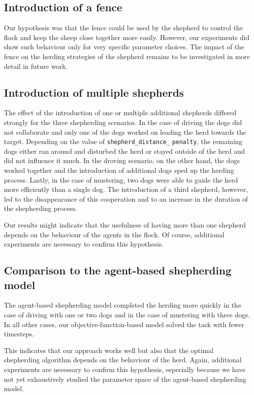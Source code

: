 \subsection{Introduction of a fence}
Our hypothesis was that the fence could be used by the shepherd to control the flock and keep the sheep close together more easily. However, our experiments did show such behaviour only for very specific parameter choices. The impact of the fence on the herding strategies of the shepherd remains to be investigated in more detail in future work.

\subsection{Introduction of multiple shepherds}
The effect of the introduction of one or multiple additional shepherds differed strongly for the three shepherding scenarios. In the case of driving the dogs did not collaborate and only one of the dogs worked on leading the herd towards the target. Depending on the value of \texttt{shepherd\_distance\_} \texttt{penalty}, the remaining dogs either ran around and disturbed the herd or stayed outside of the herd and did not influence it much. In the droving scenario, on the other hand, the dogs worked together and the introduction of additional dogs sped up the herding process. Lastly, in the case of mustering, two dogs were able to guide the herd more efficiently than a single dog. The introduction of a third shepherd, however, led to the disappearance of this cooperation and to an increase in the duration of the shepherding process.

Our results might indicate that the usefulness of having more than one shepherd depends on the behaviour of the agents in the flock. Of course, additional experiments are necessary to confirm this hypothesis.

\subsection{Comparison to the agent-based shepherding model}
The agent-based shepherding model completed the herding more quickly in the case of driving with one or two dogs and in the case of mustering with three dogs. In all other cases, our objective-function-based model solved the task with fewer timesteps.

This indicates that our approach works well but also that the optimal shepherding algorithm depends on the behaviour of the herd. Again, additional experiments are necessary to confirm this hypothesis, especially because we have not yet exhaustively studied the parameter space of the agent-based shepherding model.